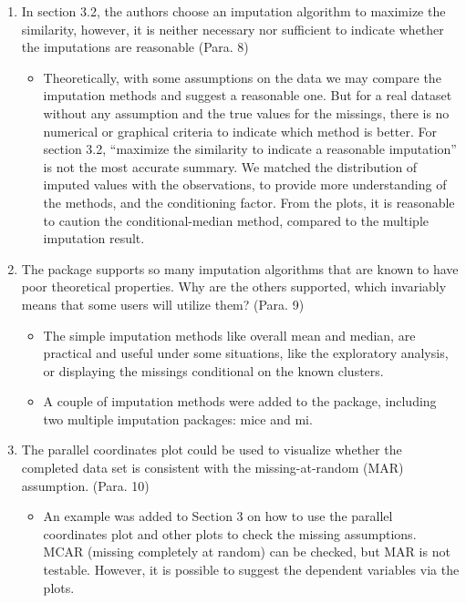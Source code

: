 \documentclass[12pt,english]{article}
\begin{document}
\begin{enumerate}
\item In section 3.2, the authors choose an imputation algorithm to maximize
the similarity, however, it is neither necessary nor sufficient to
indicate whether the imputations are reasonable (Para. 8)
\begin{itemize}
\item Theoretically, with some assumptions on the data we may compare the
imputation methods and suggest a reasonable one. But for a real dataset
without any assumption and the true values for the missings, there
is no numerical or graphical criteria to indicate which method is
better. For section 3.2, ``maximize the similarity to indicate a
reasonable imputation'' is not the most accurate summary. We matched
the distribution of imputed values with the observations, to provide
more understanding of the methods, and the conditioning factor. From
the plots, it is reasonable to caution the conditional-median method,
compared to the multiple imputation result.
\end{itemize}

\item The package supports so many imputation algorithms that are known
to have poor theoretical properties. Why are the others supported,
which invariably means that some users will utilize them? (Para. 9)
\begin{itemize}
\item The simple imputation methods like overall mean and median, are practical
and useful under some situations, like the exploratory analysis, or
displaying the missings conditional on the known clusters.
\item A couple of imputation methods were added to the package, including
two multiple imputation packages: mice and mi.
\end{itemize}

\item The parallel coordinates plot could be used to visualize whether the
completed data set is consistent with the missing-at-random (MAR)
assumption. (Para. 10)
\begin{itemize}
\item An example was added to Section 3 on how to use the parallel coordinates
plot and other plots to check the missing assumptions. MCAR (missing
completely at random) can be checked, but MAR is not testable. However,
it is possible to suggest the dependent variables via the plots.
\end{itemize}

\end{enumerate}
\clearpage{}
\end{document}
